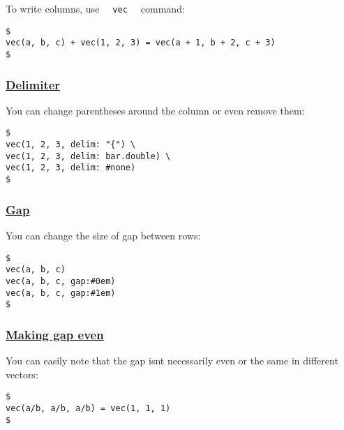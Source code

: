 To write columns, use \texttt{\ }{\texttt{\ vec\ }}\texttt{\ } command:

\begin{verbatim}
$
vec(a, b, c) + vec(1, 2, 3) = vec(a + 1, b + 2, c + 3)
$
\end{verbatim}

\pandocbounded{}

\subsubsection{\texorpdfstring{\hyperref[delimiter]{Delimiter}}{Delimiter}}\label{delimiter}

You can change parentheses around the column or even remove them:

\begin{verbatim}
$
vec(1, 2, 3, delim: "{") \
vec(1, 2, 3, delim: bar.double) \
vec(1, 2, 3, delim: #none)
$
\end{verbatim}

\pandocbounded{}

\subsubsection{\texorpdfstring{\hyperref[gap]{Gap}}{Gap}}\label{gap}

You can change the size of gap between rows:

\begin{verbatim}
$
vec(a, b, c)
vec(a, b, c, gap:#0em)
vec(a, b, c, gap:#1em)
$
\end{verbatim}

\pandocbounded{}

\subsubsection{\texorpdfstring{\hyperref[making-gap-even]{Making gap
even}}{Making gap even}}\label{making-gap-even}

You can easily note that the gap isn\textquotesingle t necessarily even
or the same in different vectors:

\begin{verbatim}
$
vec(a/b, a/b, a/b) = vec(1, 1, 1)
$
\end{verbatim}

